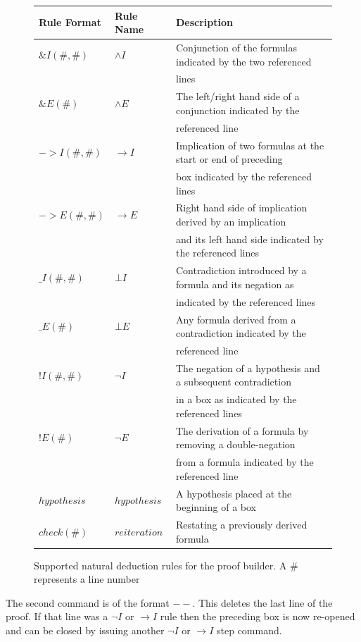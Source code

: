 \documentclass[11pt,twoside,a4paper]{report}
\begin{document}
\begin{figure}
\begin{tabular}[htp]{|l|l|l|}
\hline
Rule Format & Rule Name & Description\\
\hline
$\&I(\#,\#)$ & $\wedge I$ & Conjunction of the formulas indicated by the two referenced\\ 
&& lines\\
$\&E(\#)$ & $\wedge E$ & The left/right hand side of a conjunction indicated by the\\
&& referenced line\\
$->I(\#,\#)$ & $\rightarrow I$ & Implication of two formulas at the start or end of preceding\\
&& box indicated by the referenced lines\\
$->E(\#,\#)$ & $\rightarrow E$ & Right hand side of implication derived by an implication \\
&& and its left hand side indicated by the referenced lines\\
$\_I(\#,\#)$ & $\bot I$ & Contradiction introduced by a formula and its negation as \\
&& indicated by the referenced lines\\
$\_E(\#)$ & $\bot E$ & Any formula derived from a contradiction indicated by the \\
&& referenced line\\
$!I(\#,\#)$ & $\neg I$ & The negation of a hypothesis and a subsequent contradiction \\
&& in a box as indicated by the referenced lines\\
$!E(\#)$ & $\neg E$ & The derivation of a formula by removing a double-negation \\
&& from a formula indicated by the referenced line\\
$hypothesis$ & $hypothesis$ & A hypothesis placed at the beginning of a box\\
$check(\#)$ & $reiteration$ & Restating a previously derived formula\\
\hline
\end{tabular}
\caption{Supported natural deduction rules for the proof builder. A \# represents a line number\label{fig:ndrulesproofbuilder}}
\end{figure}

The second command is of the format $--$. This deletes the last line of the proof. If that line was a $\neg I$ or $\rightarrow I$ rule then the preceding box is now re-opened and can be closed by issuing another $\neg I$ or $\rightarrow I$ step command.
\end{document}

